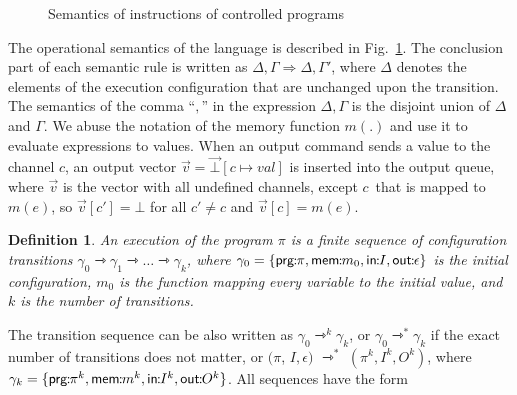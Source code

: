 \documentclass[10pt,a4paper,oneside]{article}
\newtheorem{definition}{Definition}[section]
\def\constructV#1#2{\ensuremath{\ouvd[#2\mapsto#1]}}
\def\substitute#1#2#3{\ensuremath{#1[#2\mapsto#3]}}
\def\ouvd{\ensuremath{\vec{\bot}}}
\def\chnl{\ensuremath{c}}
\def\NIL{\ensuremath{\bot}}
\def\ACCORCIA{\vspace*{-\baselineskip}}
\def\lcomma{\ensuremath{\!\!:\!\!}}
\def\valueM{\ensuremath{val}}
\def\gconf{\ensuremath{\gamma}}
\def\emptyQ{\ensuremath{\epsilon}}
\def\Prog{\ensuremath{\pi}}
\def\comm{\ensuremath{\pi}}
\def\LabelRule#1#2#3{\ensuremath{{\inferrule*[Left={#1}]{#2}{#3}}}}
\def\ROUTPUT{OUTP}
\def\lprog{{\sf prg}}
\def\lmem{{\sf mem}}
\def\linput{{\sf in}}
\def\loutput{{\sf out}}
\begin{document}
\begin{figure}[!t]
\begin{center}
\ACCORCIA	
\caption{Semantics of instructions of controlled programs}
\label{fig:CommandSem}
\end{center}
\end{figure}


The operational semantics of the language is described in Fig.~\ref{fig:CommandSem}. The conclusion part of each semantic rule is written as $\Delta, \Gamma \Rightarrow \Delta,\Gamma'$, where $\Delta$ denotes the elements of the execution configuration that are unchanged upon the transition. The semantics of the comma ``$,$'' in the expression $\Delta, \Gamma$ is the disjoint union of $\Delta$ and $\Gamma$. We abuse the notation of the memory function $m(.)$ and use it to evaluate expressions to values. When an output command sends a value to the channel $c$, an output vector $\vec{v} = \constructV{\valueM}{\chnl}$ is inserted into the output queue, where $\vec{v}$ is the vector with all undefined channels, except \chnl\ that is mapped to $m(e)$, so $\vec{v}[c'] = \NIL$ for all $c' \neq c$ and $\vec{v}[c] = m(e)$.

\begin{definition} \label{def:execution}
An \emph{execution} of the program $\Prog$ is a finite sequence of configuration transitions $\gconf_0 \rightarrowtriangle \gconf_1 \rightarrowtriangle \ldots \rightarrowtriangle \gconf_k$, where $\gconf_0 = \{ \lprog\lcomma\Prog, \lmem\lcomma m_0, \linput\lcomma I, \loutput \lcomma \emptyQ \}$ is the initial configuration, $m_0$ is the function mapping every variable to the initial value, and $k$ is the number of transitions.
\end{definition}

The transition sequence can be also written as  $\gconf_0 \rightarrowtriangle^k \gconf_k$, or $\gconf_0 \rightarrowtriangle^* \gconf_k$ if the exact number of transitions does not matter, or $(\Prog$, $I, \emptyQ)$ $\rightarrowtriangle^*$ $(\comm^k, I^k, O^k)$, where $\gconf_k =  \{\lprog\lcomma\comm^k, \lmem\lcomma m^k, \linput \lcomma I^k, \loutput\lcomma O^k \}$. All sequences have the form
\end{document}
